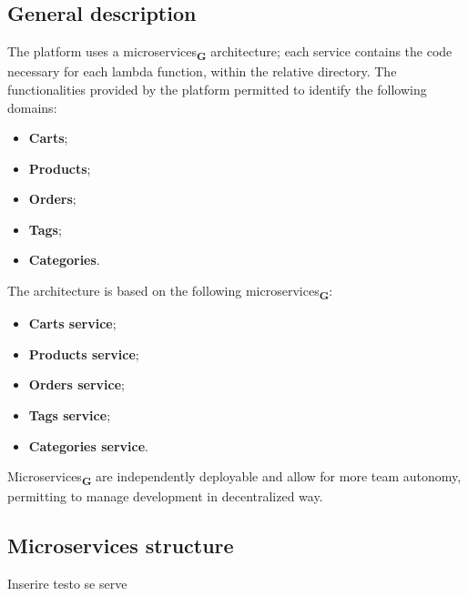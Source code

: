 \subsection{General description}
The platform uses a microservices\textsubscript{\textbf{G}} architecture; each service contains the code necessary for each lambda function, within the relative directory.
The functionalities provided by the platform permitted to identify the following domains:
\begin{itemize}
    \item \textbf{Carts};
    \item \textbf{Products};
    \item \textbf{Orders};
    \item \textbf{Tags};
    \item \textbf{Categories}.
\end{itemize}
The architecture is based on the following microservices\textsubscript{\textbf{G}}:
\begin{itemize}
    \item \textbf{Carts service};
    \item \textbf{Products service};
    \item \textbf{Orders service};
    \item \textbf{Tags service};
    \item \textbf{Categories service}.
\end{itemize}
Microservices\textsubscript{\textbf{G}} are independently deployable and allow for more team autonomy, permitting to manage development in decentralized way.
\pagebreak
\subsection{Microservices structure}
Inserire testo se serve
